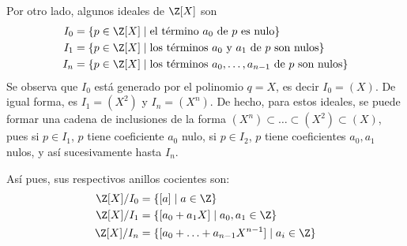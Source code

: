 \begin{TFGampliado}
    \item Por otro lado, algunos ideales de $\Z[X]$ son
    \begin{align*}
        I_0 &= \{p \in \Z[X] \mid \text{el término } a_0 \text{ de } p \text{ es nulo}\} \\
        I_1 &= \{p \in \Z[X] \mid \text{los términos } a_0 \text{ y } a_1 \text{ de } p \text{ son nulos}\} \\
        I_n &= \{p \in \Z[X] \mid \text{los términos } a_0, \ldots, a_{n-1} \text{ de } p \text{ son nulos}\}
    \end{align*}
    Se observa que $I_0$ está generado por el polinomio $q = X$, es decir $I_0 = (X)$. De igual forma, es $I_1 = (X^2)$ y $I_n = (X^n)$. De hecho, para estos ideales, se puede formar una cadena de inclusiones de la forma $(X^n) \subset \ldots \subset (X^2) \subset (X)$, pues si $p \in I_1$, $p$ tiene coeficiente $a_0$ nulo, si $p \in I_2$, $p$ tiene coeficientes $a_0,a_1$ nulos, y así sucesivamente hasta $I_n$.
    \item Así pues, sus respectivos anillos cocientes son:  
    \begin{align*}
        \Z[X]/I_0 &= \{[a]\mid a \in \Z\} \\
        \Z[X]/I_1 &= \{[a_0 + a_1X]\mid a_0,a_1 \in \Z\} \\
        \Z[X]/I_n &= \{[a_0 +\ldots + a_{n-1}X^{n-1}]\mid a_i \in \Z\}
    \end{align*}


\end{TFGampliado}
